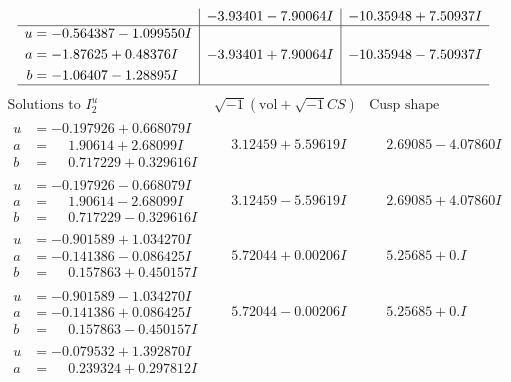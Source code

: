 \documentclass[1p]{elsarticle_modified}
\theoremstyle{definition}
\newcommand{\I}{\sqrt{-1}}
\begin{document}
$$\begin{array}{c|c|c}
 & -3.93401 - 7.90064 I & -10.35948 + 7.50937 I \\ \hline\begin{aligned}
u &= -0.564387 - 1.099550 I \\
a &= -1.87625 + 0.48376 I \\
b &= -1.06407 - 1.28895 I\end{aligned}
 & -3.93401 + 7.90064 I & -10.35948 - 7.50937 I\\
 \hline 
 \end{array}$$\newpage$$\begin{array}{c|c|c}  
\text{Solutions to }I^u_{2}& \I (\text{vol} + \sqrt{-1}CS) & \text{Cusp shape}\\
 \hline 
\begin{aligned}
u &= -0.197926 + 0.668079 I \\
a &= \phantom{-}1.90614 + 2.68099 I \\
b &= \phantom{-}0.717229 + 0.329616 I\end{aligned}
 & \phantom{-}3.12459 + 5.59619 I & \phantom{-}2.69085 - 4.07860 I \\ \hline\begin{aligned}
u &= -0.197926 - 0.668079 I \\
a &= \phantom{-}1.90614 - 2.68099 I \\
b &= \phantom{-}0.717229 - 0.329616 I\end{aligned}
 & \phantom{-}3.12459 - 5.59619 I & \phantom{-}2.69085 + 4.07860 I \\ \hline\begin{aligned}
u &= -0.901589 + 1.034270 I \\
a &= -0.141386 - 0.086425 I \\
b &= \phantom{-}0.157863 + 0.450157 I\end{aligned}
 & \phantom{-}5.72044 + 0.00206 I & \phantom{-}5.25685 + 0. I\phantom{ +0.000000I} \\ \hline\begin{aligned}
u &= -0.901589 - 1.034270 I \\
a &= -0.141386 + 0.086425 I \\
b &= \phantom{-}0.157863 - 0.450157 I\end{aligned}
 & \phantom{-}5.72044 - 0.00206 I & \phantom{-}5.25685 + 0. I\phantom{ +0.000000I} \\ \hline\begin{aligned}
u &= -0.079532 + 1.392870 I \\
a &= \phantom{-}0.239324 + 0.297812 I \\

\end{aligned}
\end{array}$$
\end{document}
